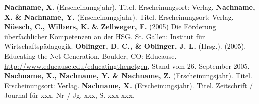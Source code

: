 \begin{thebibliography}{1}
 \textbf{Nachname, X.} (Erscheinungsjahr). Titel. Erscheinungsort: Verlag.
 \textbf{Nachname, X. \& Nachname, Y.} (Erscheinungsjahr). Titel. Erscheinungsort: Verlag.
 \textbf{Nüesch, C., Wilbers, K. \& Zellweger, F.} (2005) Die Förderung überfachlicher Kompetenzen an der
HSG. St. Gallen: Institut für Wirtschaftspädagogik.
 \textbf{Oblinger, D. C., \& Oblinger, J. L.} (Hrsg.). (2005). Educating the Net Generation. Boulder, CO:
Educause. \url{http://www.educause.edu/educatingthenetgen}, Stand vom 26. September 2005.
 \textbf{Nachname, X., Nachname, Y. \& Nachname, Z.} (Erscheinungsjahr). Titel. Erscheinungsort: Verlag.
 \textbf{Nachname, X.} (Erscheinungsjahr). Titel. Zeitschrift / Journal für xxx, Nr / Jg. xxx, S. xxx-xxx.
\end{thebibliography}
